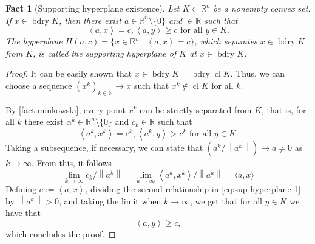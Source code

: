\documentclass[smallextended,numbook,nospthms]{svjour3}
\theoremstyle{plain}
\newtheorem{fact}[theorem]{Fact}
\theoremstyle{definition}
\def\RR{\mathds R}
\def\NN{\mathds N}
\newcommand{\scal}[2]{\left\langle{#1},{#2}  \right\rangle}
\begin{document}
\begin{fact}[Supporting hyperplane existence]\label{fact:sup hyperplane}
Let $K \subset \RR^{n}$ be a nonempty convex set. If $x \in \operatorname{bdry} K$, then there exist $a \in \RR^{n} \setminus \{0\}$ and $ \in \RR$ such that
\[
\scal{a}{x}=c, \scal{a}{y}\geq c \text{ for all } y \in K.
\]
The hyperplane $H(a,c)=\{x \in \RR^n \mid \scal{a}{x}=c\}$, which separates $x \in \operatorname{bdry} K$ from $K$, is called the \emph{supporting hyperplane} of $K$ at $x \in \operatorname{bdry} K$. 
\end{fact}
\begin{proof}
	It can be easily shown that $x \in \operatorname{bdry} K=\operatorname{bdry} \operatorname{cl} K$. Thus, we can choose a sequence $(x^k)_{k \in \NN} \rightarrow x$ such that $x^{k} \notin \operatorname{cl} K$ for all $k$. 	
	
	By \cref{fact:minkowski}, every point $x^{k}$ can be strictly separated from $K$, that is, for all $k$ there exist $\alpha^k \in \RR^n \setminus \{0\}$ and $c_k \in \RR$ such that
	\[
	\scal{a^{k}}{x^{k}}=c^{k}, \scal{a^{k}}{y}>c^{k} \text{ for all } y \in K. \label{eq:sup hyperplane 1}
	\]
	Taking a subsequence, if necessary, we can state that $\left (a^{k} /\left\|a^{k}\right\|\right) \rightarrow a \neq 0$ as $k \rightarrow \infty$. From this, it follows
	\[
	\lim _{k \rightarrow \infty} c_{k}/\left\|a^{k}\right\|=\lim _{k \rightarrow \infty}\scal{a^k}{x^k}/\left\|a^{k}\right\|=\langle a, x\rangle
	\]
	Defining $c:=\scal{a}{x}$, dividing the second relationship in \cref{eq:sup hyperplane 1} by $\left\|a^{k}\right\|>0$, and taking the limit when $k \rightarrow \infty$, we get that for all $y \in K$ we have that
	\[
	\scal{a}{y}\geq c,
	\]
	which concludes the proof.
\end{proof}
\end{document}
